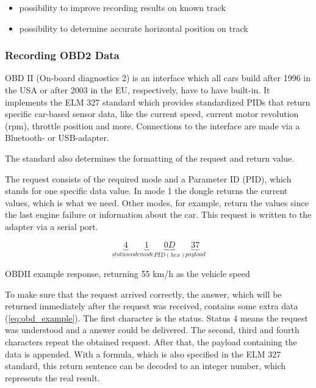 \begin{itemize}
  \item possibility to improve recording results on known track
  \item possibility to determine accurate horizontal position on track
\end{itemize}

\subsubsection{Recording OBD2 Data}
OBD II (On-board diagnostics 2) is an interface which all cars build after 1996 in the USA or after 2003 in the EU, respectively, have to have built-in. It implements the ELM 327 standard which provides standardized PIDs that return specific car-based sensor data, like the current speed, current motor revolution (rpm), throttle position and more. Connections to the interface are made via a Bluetooth- or USB-adapter.

The standard also determines the formatting of the request and return value.

The request consists of the required mode and a Parameter ID (PID), which stands for one specific data value. In mode 1 the dongle returns the current values, which is what we need. Other modes, for example, return the values since the last engine failure or information about the car. This request is written to the adapter via a serial port.

\begin{equation}
	\label{eq:obd_example}
		\underbrace{4}_{status code}
		\underbrace{1}_{mode}
		\underbrace{0D}_{PID (hex)}
		\underbrace{37}_{payload}
\end{equation}
\begin{center}
	OBDII example response, returning 55 km/h as the vehicle speed
\end{center}

To make sure that the request arrived correctly, the answer, which will be returned immediately after the request was received, contains some extra data (\ref{eq:obd_example}). The first character is the status. Status 4 means the request was understood and a answer could be delivered. The second, third and fourth characters repeat the obtained request. After that, the payload containing the data is appended. With a formula, which is also specified in the ELM 327 standard, this return sentence can be decoded to an integer number, which represents the real result.

